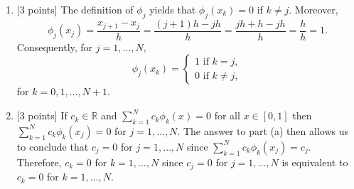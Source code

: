 \begin{solution}
\begin{enumerate}
\item {[3 points]} The definition of $\phi_j$ yields that $\phi_j(x_k)=0$ if $k\ne j$. Moreover,
\[\phi_j(x_j)=\frac{x_{j+1}-x_j}{h}=\frac{(j+1)h-jh}{h}=\frac{jh+h-jh}{h}=\frac{h}{h}=1.\]
Consequently, for $j=1,\ldots,N$,
\[ \phi_j(x_k) = \left\{ \begin{array}{l}
1\mbox{ if }k=j, \\
0\mbox{ if }k\ne j,
\end{array}\right. \]
for $k=0,1,\ldots,N+1$.

\item {[3 points]} If $c_k\in\mathbb{R}$ and $\displaystyle{\sum_{k=1}^N}c_k\phi_k(x)=0$ for all $x\in[0,1]$ then $\displaystyle{\sum_{k=1}^N}c_k\phi_k(x_j)=0$ for $j=1,\ldots,N$. The answer to part (a) then allows us to conclude that $c_j=0$ for $j=1,\ldots,N$ since $\displaystyle{\sum_{k=1}^N}c_k\phi_k(x_j)=c_j$. Therefore, $c_k=0$ for $k=1,\ldots,N$ since $c_j=0$ for $j=1,\ldots,N$ is equivalent to $c_k=0$ for $k=1,\ldots,N$.


\end{enumerate}
\end{solution}
